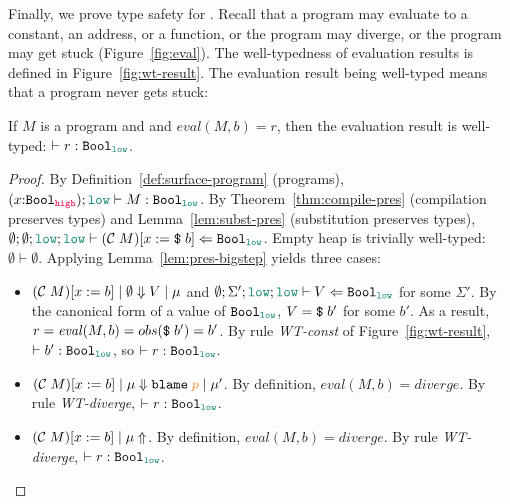 {Finally, we prove type safety for \Surface. Recall that a \Surface program may
evaluate to a constant, an address, or a function, or the program may diverge,
or the program may get stuck (Figure~\ref{fig:eval}). The well-typedness of
evaluation results is defined in Figure~\ref{fig:wt-result}. The evaluation
result being well-typed means that a \Surface program never gets stuck:

\begin{theorem}
  \label{thm:type-safety}
  If $M$ is a \Surface program and
  and $\mathit{eval}(M,b)=r$,
  then the evaluation result is well-typed: $\vdash r : \Bool_{\low}$.
\end{theorem}
\begin{proof}
  By Definition~\ref{def:surface-program} (\Surface programs),
  $(x{:}\Bool_{\high});\low \vdash M : \Bool_{\low}$. By
  Theorem~\ref{thm:compile-pres} (compilation preserves types) and
  Lemma~\ref{lem:subst-pres} (substitution preserves types), $\emptyset ;
  \emptyset ; \low ; \low \vdash (\compile{M})[x:=\ccconst{b}] \Leftarrow
  \Bool_{\low}$. Empty heap is trivially well-typed: $\emptyset \vdash
  \emptyset$. Applying Lemma~\ref{lem:pres-bigstep} yields three cases:
  \begin{itemize}
  \item $(\mathcal{C}\;{M})[x:=b] \mid \emptyset \Downarrow V \mid \mu$ and $\emptyset ; \Sigma' ; \low
    ; \low \vdash V \Leftarrow \Bool_{\low}$ for some $\Sigma'$. By the
    canonical form of a value of $\Bool_{\low}$, $V = \text{\texttt{{\$}}}\;{b'}$ for some
    $b'$. As a result, $r=\mathit{eval}(M,b)=obs(\text{\texttt{{\$}}}\;{b'})=b'$. By rule
    \textit{WT-const} of Figure~\ref{fig:wt-result}, $\vdash b' : \Bool_{\low}$,
    so $\vdash r : \Bool_{\low}$.
  \item $(\compile{M})[x:=b] \mid \mu \Downarrow \blame{p} \mid \mu'$. By
    definition, $\mathit{eval}(M,b)=\mathit{diverge}$. By rule
    \textit{WT-diverge}, $\vdash r : \Bool_{\low}$.
  \item $(\mathcal{C}\;{M})[x:=b] \mid \mu \Uparrow$. By
    definition, $\mathit{eval}(M,b)=\mathit{diverge}$. By rule
    \textit{WT-diverge}, $\vdash r : \Bool_{\low}$.
  \end{itemize}
\end{proof}

} %
